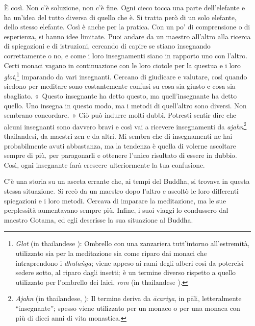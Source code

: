 È così. Non c'è soluzione, non c'è fine. Ogni cieco tocca una parte
dell'elefante e ha un'idea del tutto diversa di quello che è. Si tratta
però di un solo elefante, dello stesso elefante. Così è anche per la
pratica. Con un po' di comprensione o di esperienza, si hanno idee
limitate. Puoi andare da un maestro all'altro alla ricerca di
spiegazioni e di istruzioni, cercando di capire se stiano insegnando
correttamente o no, e come i loro insegnamenti siano in rapporto uno con
l'altro. Certi monaci vagano in continuazione con le loro ciotole per la
questua e i loro \emph{glot},\footnote{\emph{Glot} (in thailandese ):
  Ombrello con una zanzariera tutt'intorno all'estremità, utilizzato sia
  per la meditazione sia come riparo dai monaci che intraprendono i
  \emph{dhutaṅga}; viene appeso ai rami degli alberi così da potercisi
  sedere sotto, al riparo dagli insetti; è un termine diverso rispetto a
  quello utilizzato per l'ombrello dei laici, \emph{rom} (in thailandese
  ).} imparando da vari insegnanti. Cercano di giudicare e valutare,
così quando siedono per meditare sono costantemente confusi su cosa sia
giusto e cosa sia sbagliato. «~Questo insegnante ha detto questo, ma
quell'insegnante ha detto quello. Uno insegna in questo modo, ma i
metodi di quell'altro sono diversi. Non sembrano concordare.~» Ciò può
indurre molti dubbi. Potresti sentir dire che alcuni insegnanti sono
davvero bravi e così vai a ricevere insegnamenti da
\emph{ajahn}\footnote{\emph{Ajahn} (in thailandese,
  \href{http://www.thai2english.com/dictionary/1453955.html}{}):
  Il termine deriva da \emph{ācariya}, in pāli, letteralmente
  ``insegnante''; spesso viene utilizzato per un monaco o per una monaca
  con più di dieci anni di vita monastica.} thailandesi, da maestri zen
e da altri. Mi sembra che di insegnamenti ne hai probabilmente avuti
abbastanza, ma la tendenza è quella di volerne ascoltare sempre di più,
per paragonarli e ottenere l'unico risultato di essere in dubbio. Così,
ogni insegnante farà crescere ulteriormente la tua confusione.

C'è una storia su un asceta errante che, ai tempi del Buddha, si trovava
in questa stessa situazione. Si recò da un maestro dopo l'altro e
ascoltò le loro differenti spiegazioni e i loro metodi. Cercava di
imparare la meditazione, ma le sue perplessità aumentavano sempre più.
Infine, i suoi viaggi lo condussero dal maestro Gotama, ed egli
descrisse la sua situazione al Buddha.

